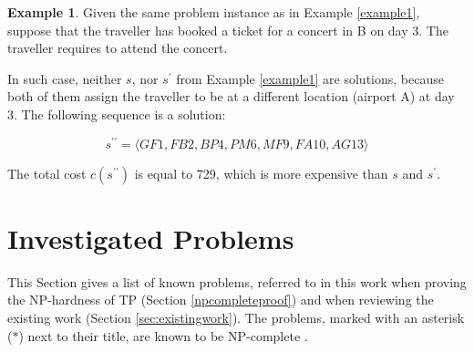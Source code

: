 \documentclass{mprop}
\theoremstyle{definition}
\newtheorem{example}{Example}
\begin{document}
\begin{example}
\label{example2}
Given the same problem instance as in Example \ref{example1}, suppose that the traveller has booked a ticket for a concert in B on day 3. The traveller requires to attend the concert.
\end{example}

\begin{solution}
In such case, neither $s$, nor $s^{\prime}$ from Example \ref{example1} are solutions, because both of them assign the traveller to be at a different location (airport A) at day 3. The following sequence is a solution:

$$ s^{\prime\prime} = \langle GF1, FB2, BP4, PM6, MF9, FA10, AG13\rangle $$

The total cost $c(s^{\prime\prime})$ is equal to 729, which is more expensive than $s$ and $s^{\prime}$.
\end{solution}

\section{Investigated Problems}
\label{npcompleteproblems}

This Section gives a list of known problems, referred to in this work when proving the NP-hardness of TP (Section \ref{npcompleteproof}) and when reviewing the existing work (Section \ref{sec:existingwork}). The problems, marked with an asterisk ($\ast$) next to their title, are known to be NP-complete \citep{thebible}.
\end{document}
